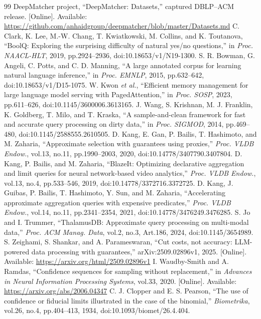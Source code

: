 \begin{thebibliography}{99}
 DeepMatcher project, ``DeepMatcher: Datasets,'' captured DBLP--ACM release. [Online]. Available: \url{https://github.com/anhaidgroup/deepmatcher/blob/master/Datasets.md}
 C. Clark, K. Lee, M.-W. Chang, T. Kwiatkowski, M. Collins, and K. Toutanova, ``BoolQ: Exploring the surprising difficulty of natural yes/no questions,'' in \emph{Proc. NAACL-HLT}, 2019, pp.2924--2936, doi:10.18653/v1/N19-1300.
 S. R. Bowman, G. Angeli, C. Potts, and C. D. Manning, ``A large annotated corpus for learning natural language inference,'' in \emph{Proc. EMNLP}, 2015, pp.632--642, doi:10.18653/v1/D15-1075.
 W. Kwon \emph{et al.}, ``Efficient memory management for large language model serving with PagedAttention,'' in \emph{Proc. SOSP}, 2023, pp.611--626, doi:10.1145/3600006.3613165.
 J. Wang, S. Krishnan, M. J. Franklin, K. Goldberg, T. Milo, and T. Kraska, ``A sample-and-clean framework for fast and accurate query processing on dirty data,'' in \emph{Proc. SIGMOD}, 2014, pp.469--480, doi:10.1145/2588555.2610505.
 D. Kang, E. Gan, P. Bailis, T. Hashimoto, and M. Zaharia, ``Approximate selection with guarantees using proxies,'' \emph{Proc. VLDB Endow.}, vol.13, no.11, pp.1990--2003, 2020, doi:10.14778/3407790.3407804.
 D. Kang, P. Bailis, and M. Zaharia, ``BlazeIt: Optimizing declarative aggregation and limit queries for neural network-based video analytics,'' \emph{Proc. VLDB Endow.}, vol.13, no.4, pp.533--546, 2019, doi:10.14778/3372716.3372725.
 D. Kang, J. Guibas, P. Bailis, T. Hashimoto, Y. Sun, and M. Zaharia, ``Accelerating approximate aggregation queries with expensive predicates,'' \emph{Proc. VLDB Endow.}, vol.14, no.11, pp.2341--2354, 2021, doi:10.14778/3476249.3476285.
 S. Jo and I. Trummer, ``ThalamusDB: Approximate query processing on multi-modal data,'' \emph{Proc. ACM Manag. Data}, vol.2, no.3, Art.186, 2024, doi:10.1145/3654989.
 S. Zeighami, S. Shankar, and A. Parameswaran, ``Cut costs, not accuracy: LLM-powered data processing with guarantees,'' arXiv:2509.02896v1, 2025. [Online]. Available: \url{https://arxiv.org/html/2509.02896v1}
 I. Waudby-Smith and A. Ramdas, ``Confidence sequences for sampling without replacement,'' in \emph{Advances in Neural Information Processing Systems}, vol.33, 2020. [Online]. Available: \url{https://arxiv.org/abs/2006.04347}
 C. J. Clopper and E. S. Pearson, ``The use of confidence or fiducial limits illustrated in the case of the binomial,'' \emph{Biometrika}, vol.26, no.4, pp.404--413, 1934, doi:10.1093/biomet/26.4.404.

\end{thebibliography}
